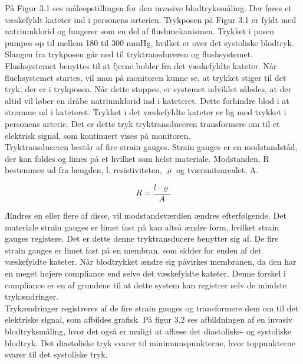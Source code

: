 På Figur 3.1 ses måleopstillingen for den invasive blodtryksmåling. Der føres et væskefyldt kateter ind i personens arterien. Trykposen på Figur 3.1 er fyldt med natriumklorid og fungerer som en del af flushmekanismen. Trykket i posen pumpes op til mellem 180 til 300 mmHg, hvilket er over det systoliske blodtryk. \\
Slangen fra trykposen går ned til tryktransduceren og flushsystemet. Flushsystemet benyttes til at fjerne bobler fra det væskefyldte kateter. Når fluchsystemet startes, vil man på monitoren kunne se, at trykket stiger til det tryk, der er i trykposen. Når dette stoppes, er systemet udviklet således, at der altid vil løber en dråbe natriumklorid ind i kateteret. Dette forhindre blod i at strømme ud i kateteret. Trykket i det væskefyldte kateter er lig med trykket i personens arterie. Det er dette tryk tryktransduceren transformere om til et elektrisk signal, som kontinuert vises på monitoren. \\
Tryktransduceren består af fire strain gauges. Strain gauges er en modstandståd, der kan foldes og limes på et hvilket som helst materiale. Modstanden, R bestemmes ud fra længden, l, resistiviteten, $\varrho$ og tværsnitsarealet, A. 

\begin{equation}
	R = \frac{l \cdot \varrho}{A}
\end{equation}

Ændres en eller flere af disse, vil modstandsværdien ændres efterfølgende. Det materiale strain gauges er limet fast på kan altså ændre form, hvilket strain gauges registere. Det er dette denne tryktransducere benytter sig af. De fire strain gauges er limet fast på en membran, som sidder for enden af det væskefyldte kateter. Når blodtrykket ændre sig påvirkes membranen, da den har en meget højere compliance end selve det væskefyldte kateter. Denne forskel i compliance er en af grundene til at dette system kan registrer selv de mindste trykændringer. \\ 
Trykændringer registreres af de fire strain gauges og transformere dem om til det elektriske signal, som afbildes grafisk. På figur 3.2 ses afbildningen af en invasiv blodtryksmåling, hvor det også er muligt at aflæse det diastoliske- og systoliske blodtryk.  Det diastoliske tryk svarer til minimumspunkterne, hvor toppunkterne svarer til det systoliske tryk.


